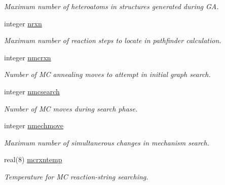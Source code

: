 \begin{DoxyCompactItemize}
\begin{DoxyCompactList}\small\item\em Maximum number of heteroatoms in structures generated during GA. \end{DoxyCompactList}\item 
\mbox{\label{namespaceglobaldata_aeae934e06e7fa7b5b91d243b952abd29}} 
integer \mbox{\hyperlink{namespaceglobaldata_aeae934e06e7fa7b5b91d243b952abd29}{nrxn}}
\begin{DoxyCompactList}\small\item\em Maximum number of reaction steps to locate in pathfinder calculation. \end{DoxyCompactList}\item 
\mbox{\label{namespaceglobaldata_ab566f897a2e2f865ee8c490879c712c1}} 
integer \mbox{\hyperlink{namespaceglobaldata_ab566f897a2e2f865ee8c490879c712c1}{nmcrxn}}
\begin{DoxyCompactList}\small\item\em Number of MC annealing moves to attempt in initial graph search. \end{DoxyCompactList}\item 
\mbox{\label{namespaceglobaldata_ac4e6fa88690f086a9b08eda6c6ba699a}} 
integer \mbox{\hyperlink{namespaceglobaldata_ac4e6fa88690f086a9b08eda6c6ba699a}{nmcsearch}}
\begin{DoxyCompactList}\small\item\em Number of MC moves during search phase. \end{DoxyCompactList}\item 
\mbox{\label{namespaceglobaldata_aaf16d9f4091f51a725b3be4827109955}} 
integer \mbox{\hyperlink{namespaceglobaldata_aaf16d9f4091f51a725b3be4827109955}{nmechmove}}
\begin{DoxyCompactList}\small\item\em Maximum number of simultanerous changes in mechanism search. \end{DoxyCompactList}\item 
\mbox{\label{namespaceglobaldata_ac85ec944e18bb6570b4c865d4eed39dc}} 
real(8) \mbox{\hyperlink{namespaceglobaldata_ac85ec944e18bb6570b4c865d4eed39dc}{mcrxntemp}}
\begin{DoxyCompactList}\small\item\em Temperature for MC reaction-\/string searching. \end{DoxyCompactList}\item 

\end{DoxyCompactItemize}
